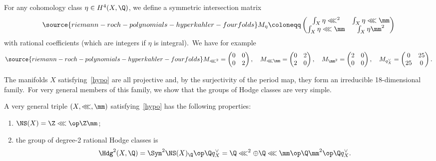 For any  cohomology class
$\eta\in H^4(X,\Q)$, we define a symmetric intersection matrix
\begin{eqnarray}\label{eqmatriceO}
\source{riemann-roch-polynomials-hyperkahler-fourfolds}
M_\eta\coloneqq
\begin{pmatrix}
\int_X\eta\lll^2& \int_X\eta\lll\mm \\
\int_X\eta\lll\mm & \int_X\eta\mm^2
\end{pmatrix}
\end{eqnarray}
with rational coefficients (which are integers if $\eta$ is integral).\
We have for example
\begin{eqnarray}\label{eqdematl2m2}
\source{riemann-roch-polynomials-hyperkahler-fourfolds}
M_{\lll^2}=\begin{pmatrix}
0 & 0 \\
0 & 2
\end{pmatrix},\quad M_{\lll\mm}=\begin{pmatrix}
0 & 2 \\
2 & 0
\end{pmatrix}, \quad M_{\mm^2}=\begin{pmatrix}
2 & 0 \\
0 & 0
\end{pmatrix}, \quad M_{q_X^\vee}=\begin{pmatrix}
0 & 25 \\
25 & 0
\end{pmatrix}.
\end{eqnarray}


The manifolds $X$ satisfying~\eqref{hypo} are all projective and, by the surjectivity of the period map, they form an irreducible 18-dimensional family.\
For very general members of this family, we show that the groups of Hodge classes are very simple.


\begin{prop}
\notready\label{prop:SurfacesOnHK4}
A very general triple $(X,\lll,\mm)$ satisfying~\eqref{hypo} has the following properties:
\begin{enumerate}[{\rm (a)}]
\item\label{aaa} $\NS(X)=\Z\lll\op \Z\mm$;
\item\label{bbb} the group of degree-2 rational Hodge classes is
\source{riemann-roch-polynomials-hyperkahler-fourfolds}
$$\Hdg^2(X,\Q)={\Sym}^2{\NS}(X)_{\Q}\op\Q q_X^\vee=\Q\lll^2\oplus \Q\lll\mm\op\Q\mm^2\op\Q q_X^\vee.$$
\end{enumerate}
\end{prop}

